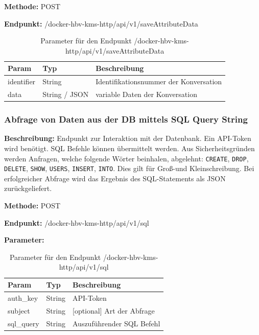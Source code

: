\textbf{Methode:} POST

\textbf{Endpunkt:} /docker-hbv-kms-http/api/v1/saveAttributeData

\begin{table}[H]
    \label{table:/docker-hbv-kms-http/api/v1/saveAttributeData}
    \caption{Parameter für den Endpunkt /docker-hbv-kms-http/api/v1/saveAttributeData}
    \setlength{\tabcolsep}{3pt}
    \begin{tabular}{p{100pt}p{80pt}p{200pt}}
        \toprule
        Param      & Typ           & Beschreibung                           \\
        \midrule
        identifier & String        & Identifikationsnummer der Konversation \\
        data       & String / JSON & variable Daten der Konversation        \\
        \bottomrule
    \end{tabular}
\end{table}
\dotfill



\subsubsection{Abfrage von Daten aus der DB mittels SQL Query String}
\label{sec:api-sql-query}
\textbf{Beschreibung:} Endpunkt zur Interaktion mit der Datenbank. Ein API-Token wird benötigt. SQL Befehle können übermittelt werden. Aus Sicherheitsgründen werden Anfragen, welche folgende Wörter beinhalen, abgelehnt: \verb|CREATE|, \verb|DROP|, \verb|DELETE|, \verb|SHOW|, \verb|USERS|, \verb|INSERT|, \verb|INTO|. Dies gilt für Groß-und Kleinschreibung. Bei erfolgreicher Abfrage wird das Ergebnis des SQL-Statements als JSON zurückgeliefert.

\textbf{Methode:} POST

\textbf{Endpunkt:} /docker-hbv-kms-http/api/v1/sql

\textbf{Parameter:}
\begin{table}[H]
    \label{table:/docker-hbv-kms-http/api/v1/sql}
    \caption{Parameter für den Endpunkt /docker-hbv-kms-http/api/v1/sql}
    \setlength{\tabcolsep}{3pt}
    \begin{tabular}{p{100pt}p{80pt}p{200pt}}
        \toprule
        Param      & Typ    & Beschreibung               \\
        \midrule
        auth\_key  & String & API-Token                  \\
        subject    & String & [optional] Art der Abfrage \\
        sql\_query & String & Auszuführender SQL Befehl  \\
        \bottomrule
    \end{tabular}
\end{table}
\dotfill

